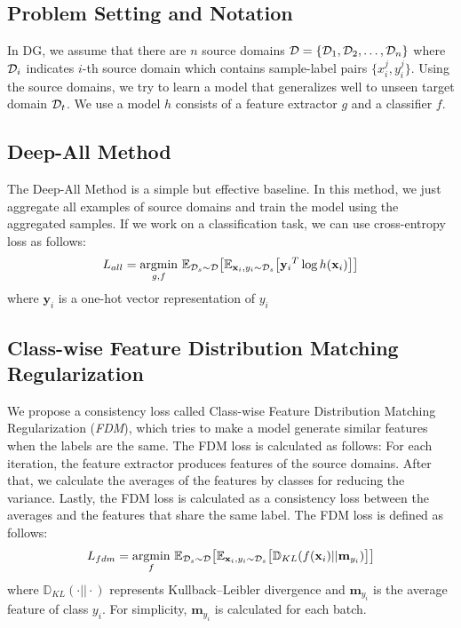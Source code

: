\subsection{Problem Setting and Notation}
In DG, we assume that there are $n$ source domains $\mathcal{D} = \{\mathcal{D}_1, \mathcal{D}_2, \dots, \mathcal{D}_n\}$ where $\mathcal{D}_i$ indicates $i$-th source domain which contains sample-label pairs $\{x_i^j, y_i^j\}$. Using the source domains, we try to learn a model that generalizes well to unseen target domain $\mathcal{D}_t$. We use a model $h$ consists of a feature extractor $g$ and a classifier $f$. 

\subsection{Deep-All Method}
The Deep-All Method is a simple but effective baseline. In this method, we just aggregate all examples of source domains and train the model using the aggregated samples. If we work on a classification task, we can use cross-entropy loss as follows:
\begin{equation}
\label{eq:agg}
\begin{aligned}
L_{all} = \underset{g, f}{\operatorname{argmin}}~ \mathbb{E}_{\mathcal{D}_s\sim\mathcal{D}} \big[ \mathbb{E}_{\mathbf{x}_i,y_i\sim \mathcal{D}_s} \big[  {\mathbf{y}_i}^{T} \log h(\mathbf{x}_i) \big] \big]
\end{aligned}
\end{equation}
where $\mathbf{y}_i$ is a one-hot vector representation of $y_i$

\subsection{Class-wise Feature Distribution Matching Regularization}
We propose a consistency loss called Class-wise Feature Distribution Matching Regularization (\textit{FDM}), which tries to make a model generate similar features when the labels are the same. The FDM loss is calculated as follows: For each iteration, the feature extractor produces features of the source domains. After that, we calculate the averages of the features by classes for reducing the variance. Lastly, the FDM loss is calculated as a consistency loss between the averages and the features that share the same label. The FDM loss is defined as follows:
\begin{equation}
\label{eq:fdm}
\begin{aligned}
L_{fdm} = \underset{f}{\operatorname{argmin}}~ \mathbb{E}_{\mathcal{D}_s\sim\mathcal{D}} \big[ \mathbb{E}_{\mathbf{x}_i,y_i\sim \mathcal{D}_s} \big[  \mathbb{D}_{KL}(f(\mathbf{x}_i)|| \mathbf{m}_{y_i}) \big] \big]
\end{aligned}
\end{equation}
where $\mathbb{D}_{KL}(\cdot || \cdot)$ represents Kullback–Leibler divergence and $\mathbf{m}_{y_i}$ is the average feature of class $y_i$. For simplicity, $\mathbf{m}_{y_i}$ is calculated for each batch.

